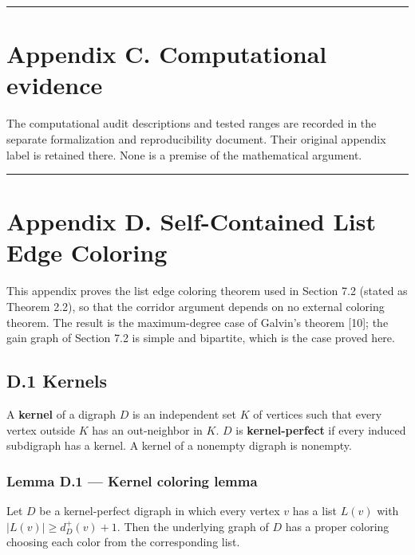 \documentclass[english,11pt,a4paper]{article}
\newcounter{none}
\begin{document}
\begin{center}\rule{0.5\linewidth}{0.5pt}\end{center}

\section{Appendix C. Computational
evidence}\label{appendix-c.-computational-evidence}

The computational audit descriptions and tested ranges are recorded in
the separate formalization and reproducibility document. Their original
appendix label is retained there. None is a premise of the mathematical
argument.

\begin{center}\rule{0.5\linewidth}{0.5pt}\end{center}

\section{Appendix D. Self-Contained List Edge
Coloring}\label{appendix-d.-self-contained-list-edge-coloring}

This appendix proves the list edge coloring theorem used in Section 7.2
(stated as Theorem 2.2), so that the corridor argument depends on no
external coloring theorem. The result is the maximum-degree case of
Galvin's theorem {[}10{]}; the gain graph of Section 7.2 is simple and
bipartite, which is the case proved here.

\subsection{D.1 Kernels}\label{d.1-kernels}

A \textbf{kernel} of a digraph \(D\) is an independent set \(K\) of
vertices such that every vertex outside \(K\) has an out-neighbor in
\(K\). \(D\) is \textbf{kernel-perfect} if every induced subdigraph has
a kernel. A kernel of a nonempty digraph is nonempty.

\subsubsection{Lemma D.1 --- Kernel coloring
lemma}\label{lemma-d.1-kernel-coloring-lemma}

Let \(D\) be a kernel-perfect digraph in which every vertex \(v\) has a
list \(L(v)\) with \(|L(v)|\ge d^+_D(v)+1\). Then the underlying graph
of \(D\) has a proper coloring choosing each color from the
corresponding list.
\end{document}
